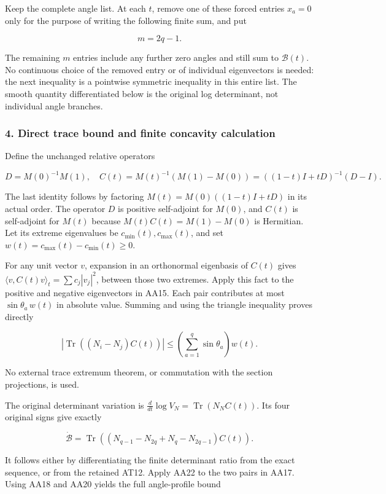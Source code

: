 \documentclass{article}
\begin{document}
Keep the complete angle list. At each \(t\), remove one of these forced entries \(x_a=0\) only for the purpose of writing the following finite sum, and put

\[
m=2q-1.
\tag{AA20}
\]

The remaining \(m\) entries include any further zero angles and still sum to \(\mathcal B(t)\). No continuous choice of the removed entry or of individual eigenvectors is needed: the next inequality is a pointwise symmetric inequality in this entire list. The smooth quantity differentiated below is the original log determinant, not individual angle branches.

\subsubsection{4. Direct trace bound and finite concavity calculation}\label{endpoint-all_degree_angle_review--direct-trace-bound-and-finite-concavity-calculation}

Define the unchanged relative operators

\[
D=M(0)^{-1}M(1),\quad
C(t)=M(t)^{-1}(M(1)-M(0))
=((1-t)I+tD)^{-1}(D-I).
\tag{AA21}
\]

The last identity follows by factoring \(M(t)=M(0)((1-t)I+tD)\) in its actual order. The operator \(D\) is positive self-adjoint for \(M(0)\), and \(C(t)\) is self-adjoint for \(M(t)\) because \(M(t)C(t)=M(1)-M(0)\) is Hermitian. Let its extreme eigenvalues be \(c_{\min}(t),c_{\max}(t)\), and set \(w(t)=c_{\max}(t)-c_{\min}(t)\ge0\).

For any unit vector \(v\), expansion in an orthonormal eigenbasis of \(C(t)\) gives \(\langle v,C(t)v\rangle_t=\sum c_j|v_j|^2\), between those two extremes. Apply this fact to the positive and negative eigenvectors in AA15. Each pair contributes at most \(\sin\theta_a\,w(t)\) in absolute value. Summing and using the triangle inequality proves directly

\[
|\operatorname{Tr}((N_i-N_j)C(t))|
\le\left(\sum_{a=1}^q\sin\theta_a\right)w(t).
\tag{AA22}
\]

No external trace extremum theorem, or commutation with the section projections, is used.

The original determinant variation is \(\frac d{dt}\log V_N=\operatorname{Tr}(N_N C(t))\). Its four original signs give exactly

\[
\dot{\mathcal B}
=\operatorname{Tr}((N_{q-1}-N_{2q}+N_q-N_{2q-1})C(t)).
\tag{AA23}
\]

It follows either by differentiating the finite determinant ratio from the exact sequence, or from the retained AT12. Apply AA22 to the two pairs in AA17. Using AA18 and AA20 yields the full angle-profile bound
\end{document}
